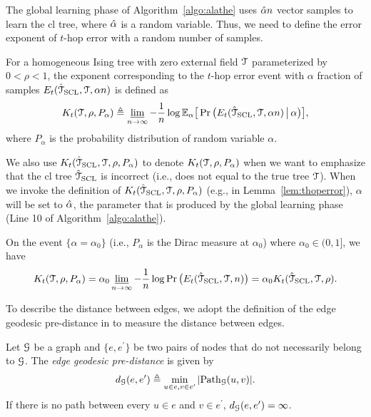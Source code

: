 The global learning phase of Algorithm~\ref{algo:alathe} uses $\hat{\alpha} n$ vector samples to learn the \ac{cl} tree, where $\hat{\alpha}$ is a random variable. Thus, we need to define the error exponent of 
$t$-hop error with a random number of samples.
\begin{definition}
For a homogeneous Ising tree with zero external field $\mathcal{T}$ parameterized by $0<\rho<1$, the exponent corresponding to the $t$-hop error event with $\alpha$ fraction of samples $E_{t}(\hat{\mathcal{T}}_{{\rm SCL}},\mathcal{T},\alpha n)$ is defined as
\begin{align}
	K_{t}(\mathcal{T},\rho,P_{\alpha})\triangleq\varliminf_{n\rightarrow\infty} -\frac{1}{n}\log\mathbb{E}_{\alpha}\big[\Pr\big(E_{t}(\hat{\mathcal{T}}_{{\rm SCL}},\mathcal{T},\alpha n)\,\big|\,\alpha \big)\big],
\end{align}
where $P_{\alpha}$ is the probability distribution of random variable $\alpha$.
\end{definition}
We also use $K _{t}(\hat{\mathcal{T}}_{{\rm SCL}},\mathcal{T},\rho,P_{\alpha})$ to denote $K _{t}(\mathcal{T},\rho,P_{\alpha})$ when we want to emphasize that the \ac{cl} tree $\hat{\mathcal{T}}_{{\rm SCL}}$ is incorrect (i.e., does not equal to the true tree $\mathcal{T}$). When we invoke the definition of $K_t(\hat{\mathcal{T}}_{{\rm SCL}},\mathcal{T},\rho,P_{\alpha})$ (e.g., in Lemma~\ref{lem:thoperror}), $\alpha$ will be set to $\hat{\alpha}$, the parameter that is produced by the global learning phase (Line 10 of Algorithm~\ref{algo:alathe}).
\begin{remark}
	On the event $\{\alpha=\alpha_{0}\}$ (i.e., $P_\alpha$ is the Dirac measure at $\alpha_0$) where $\alpha_{0}\in(0,1]$, we have
	\begin{align}
		K _{t}(\mathcal{T},\rho,P_{\alpha})=\alpha_{0} \varliminf_{n\rightarrow\infty} -\frac{1}{n}\log\Pr\big(E_{t}(\hat{\mathcal{T}}_{{\rm SCL}},\mathcal{T},n)\big)=\alpha_{0} K _{t}(\hat{\mathcal{T}}_{{\rm SCL}},\mathcal{T},\rho).
	\end{align}
\end{remark}
To describe the distance between edges, we adopt the definition of the edge geodesic pre-distance in \cite{neykov2019property} 
to measure the distance between edges.
\begin{definition}
	Let $\mathcal{G}$ be a graph and $\{e,e^{\prime}\}$ be two pairs of nodes that do not necessarily  belong to $\mathcal{G}$. The {\em edge geodesic pre-distance} is given by
	\begin{align}
		d_{\mathcal{G}}(e,e^{\prime})\triangleq \min_{u\in e,v\in e^{\prime}} |{\rm Path}_{\mathcal{G}}(u,v)|.
	\end{align}
	If there is no path between  every $u\in e$ and $v\in e^{\prime}$, $d_{\mathcal{G}}(e,e^{\prime})=\infty$.
\end{definition}
